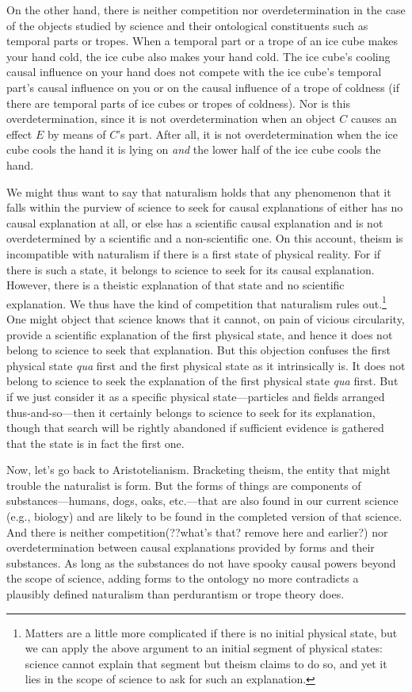 On the other hand, there is neither
competition nor overdetermination in the case of the objects studied by science and their ontological
constituents such as temporal parts or tropes. When a temporal part or a trope of an ice cube makes 
your hand cold, the ice cube also makes your hand cold. The ice cube's cooling causal influence on your hand
does not compete with the ice cube's temporal part's causal influence on you or on the causal influence of 
a trope of coldness (if there are temporal parts of ice cubes or tropes of coldness). Nor is this overdetermination,
since it is not overdetermination when an object $C$ causes an effect $E$ by means of $C$'s part. After all,
it is not overdetermination when the ice cube cools the hand it is lying on \textit{and} the lower half of 
the ice cube cools the hand. 

We might thus want to say that naturalism holds that any phenomenon that it falls within the purview of science 
to seek for causal explanations of either has no causal explanation at all, or else has a scientific causal explanation 
and is not overdetermined by a scientific and a non-scientific one. On this account, theism is incompatible with
naturalism if there is a first state of physical reality. For if there is such a state, it belongs
to science to seek for its causal explanation. However, there is a theistic explanation of that state and no 
scientific explanation. We thus have the kind of competition that naturalism rules out.\footnote{Matters are a little more
complicated if there is no initial physical state, but we can apply the above argument to an initial
segment of physical states: science cannot explain that segment but theism claims to do so, and yet it lies
in the scope of science to ask for such an explanation.} One might object that science knows that it cannot, on pain
of vicious circularity, provide a scientific explanation of the first physical state, and hence it does not belong to
science to seek that explanation. But this objection confuses the first physical state \textit{qua} first and the
first physical state as it intrinsically is. It does not belong to science to seek the explanation of the first physical
state \textit{qua} first. But if we just consider it as a specific physical state---particles and fields arranged thus-and-so---then
it certainly belongs to science to seek for its explanation, though that search will be rightly abandoned if sufficient evidence
is gathered that the state is in fact the first one.

Now, let's go back to Aristotelianism. Bracketing theism, the entity that might trouble the naturalist is form.
But the forms of things are components of substances---humans, dogs, oaks, etc.---that are also found in our current
science (e.g., biology) and are likely to be found in the completed version of that science. And there is neither
competition(??what's that? remove here and earlier?) nor overdetermination between causal explanations provided by
forms and their substances. As long as the substances do not have spooky causal powers beyond the scope of science,
adding forms to the ontology no more contradicts a plausibly defined naturalism than perdurantism or trope theory
does.

